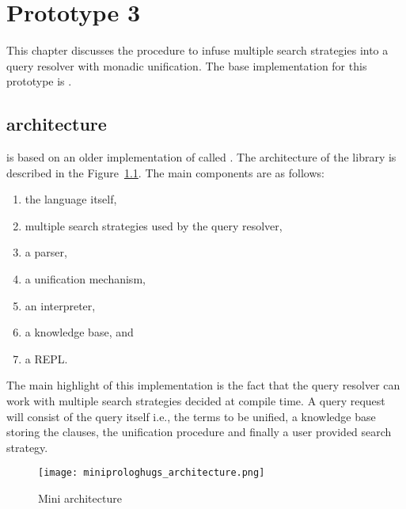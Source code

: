 \documentclass[thesis-solanki.tex]{files}
\begin{document}
\chapter{Prototype 3}{\label{proto3}}

This chapter discusses the procedure to infuse multiple search strategies into a  query resolver
with monadic unification.
The base implementation for this prototype is 
\cite{website:mini-prolog-hugs98}.


\section{ \cite{website:mini-prolog-hugs98} architecture}
 is based on an older implementation of  called
.
The architecture of the library is described in the Figure~\ref{fig:miniprlgarchitecture}.
The main components are as follows:

\begin{enumerate}
\item the language itself,

\item multiple search strategies used by the query resolver,

\item a parser,

\item a unification mechanism,

\item an interpreter,

\item a knowledge base, and

\item a REPL.  
\end{enumerate}

The main highlight of this implementation is the fact that the query resolver can work with multiple search
strategies decided at compile time.
A query request will consist of the query itself i.e., the terms to be unified, a knowledge base storing the
clauses, the unification procedure and finally a user provided search strategy.


\begin{figure}[H]
  \centering
  \texttt{[image: miniprologhugs\_architecture.png]}
  \caption{Mini  architecture}
  \label{fig:miniprlgarchitecture}
\end{figure}
\end{document}
